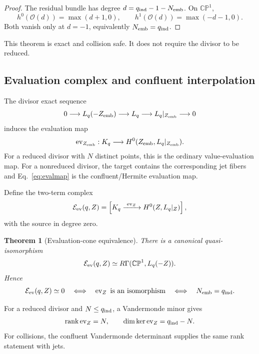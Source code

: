 \documentclass[aps,prd,preprint,nofootinbib,superscriptaddress]{revtex4-2}
\newtheorem{theorem}{Theorem}[section]
\theoremstyle{definition}
\theoremstyle{remark}
\newcommand{\rankop}{\operatorname{rank}}
\newcommand{\ev}{\operatorname{ev}}
\newcommand{\cE}{\mathcal E}
\newcommand{\cO}{\mathcal O}
\newcommand{\CP}{\mathbb{CP}}
\begin{document}
\begin{proof}
The residual bundle has degree $d=q_{\rm ind}-1-N_{\rm emb}$.  On $\CP^1$,
\[
h^0(\cO(d))=\max(d+1,0),
\qquad
h^1(\cO(d))=\max(-d-1,0).
\]
Both vanish only at $d=-1$, equivalently $N_{\rm emb}=q_{\rm ind}$.
\end{proof}

This theorem is exact and collision safe.  It does not require the divisor to be reduced.

\subsection{Evaluation complex and confluent interpolation}

The divisor exact sequence
\begin{equation}
0
\longrightarrow
L_q(-Z_{\rm emb})
\longrightarrow
L_q
\longrightarrow
L_q|_{Z_{\rm emb}}
\longrightarrow0
\label{eq:divisorsequence}
\end{equation}
induces the evaluation map
\begin{equation}
\ev_{Z_{\rm emb}}:
K_q
\longrightarrow
H^0(Z_{\rm emb},L_q|_{Z_{\rm emb}}).
\label{eq:evalmap}
\end{equation}
For a reduced divisor with $N$ distinct points, this is the ordinary value-evaluation map.  For a nonreduced divisor, the target contains the corresponding jet fibers and Eq.~\eqref{eq:evalmap} is the confluent/Hermite evaluation map.

Define the two-term complex
\begin{equation}
\cE_{\rm ev}(q,Z)
=
\left[
K_q
\xrightarrow{\ \ev_Z\ }
H^0(Z,L_q|_Z)
\right],
\label{eq:evalcomplex}
\end{equation}
with the source in degree zero.

\begin{theorem}[Evaluation-cone equivalence]
\label{thm:evalcone}
There is a canonical quasi-isomorphism
\begin{equation}
\cE_{\rm ev}(q,Z)
\simeq
R\Gamma(\CP^1,L_q(-Z)).
\label{eq:evalquasi}
\end{equation}
Hence
\begin{equation}
\cE_{\rm ev}(q,Z)\simeq0
\quad\Longleftrightarrow\quad
\ev_Z\ {\rm is\ an\ isomorphism}
\quad\Longleftrightarrow\quad
N_{\rm emb}=q_{\rm ind}.
\label{eq:evalequiv}
\end{equation}
\end{theorem}

For a reduced divisor and $N\le q_{\rm ind}$, a Vandermonde minor gives
\begin{equation}
\rankop\ev_Z=N,
\qquad
\dim\ker\ev_Z=q_{\rm ind}-N.
\label{eq:vandermonde}
\end{equation}
For collisions, the confluent Vandermonde determinant supplies the same rank statement with jets.
\end{document}
